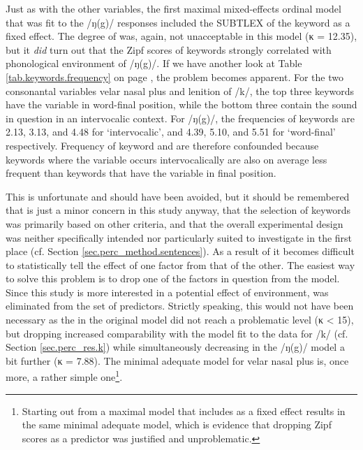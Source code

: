 Just as with the other variables, the first maximal mixed-effects ordinal model that was fit to the /ŋ(g)/ responses included the SUBTLEX  of the keyword as a fixed effect.
The degree of  was, again, not unacceptable in this model (κ = 12.35), but it \emph{did} turn out that the Zipf scores of keywords strongly correlated with phonological environment of /ŋ(g)/.
If we have another look at Table \ref{tab.keywords.frequency} on page \pageref{tab.keywords.frequency}, the problem becomes apparent.
For the two consonantal variables velar nasal plus and lenition of /k/, the top three keywords have the variable in word-final position, while the bottom three contain the sound in question in an intervocalic context.
For /ŋ(g)/, the frequencies of keywords are 2.13, 3.13, and 4.48 for `intervocalic', and 4.39, 5.10, and 5.51 for `word-final' respectively.
Frequency of keyword and  are therefore confounded because keywords where the variable occurs intervocalically are also on average less frequent than keywords that have the variable in final position.

This is unfortunate and should have been avoided, but it should be remembered that  is just a minor concern in this study anyway, that the selection of keywords was primarily based on other criteria, and that the overall experimental design was neither specifically intended nor particularly suited to investigate  in the first place (cf. Section \ref{sec.perc_method.sentences}).
As a result of  it becomes difficult to statistically tell the effect of one factor from that of the other.
The easiest way to solve this problem is to drop one of the factors in question from the model.
Since this study is more interested in a potential effect of environment,  was eliminated from the set of predictors.
Strictly speaking, this would not have been necessary as the  in the original model did not reach a problematic level (κ < 15), but dropping  increased comparability with the model fit to the data for /k/ (cf. Section \ref{sec.perc_res.k}) while simultaneously decreasing  in the /ŋ(g)/ model a bit further (κ = 7.88).
The minimal adequate model for velar nasal plus is, once more, a rather simple one\footnote{Starting out from a maximal model that includes  as a fixed effect results in the same minimal adequate model, which is evidence that dropping Zipf scores as a predictor was justified and unproblematic.}.

